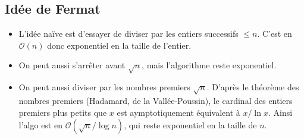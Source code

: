         \subsection{Idée de Fermat}
            \begin{itemize}
                \item L'idée naïve est d'essayer de diviser par les entiers successifs $\leq n$. C'est en $\mathcal{O}(n)$ donc exponentiel en la taille de l'entier.
                \item On peut aussi s'arrêter avant $\sqrt{n}$, mais l'algorithme reste exponentiel.
                \item On peut aussi diviser par les nombres premiers $\sqrt{n}$. D'après le théorème des nombres premiers (Hadamard, de la Vallée-Poussin), le cardinal des entiers premiers plus petits que $x$ est aymptotiquement équivalent à $x/\ln x$. Ainsi l'algo est en $\mathcal{O}(\sqrt{n}/\log n)$, qui reste exponentiel en la taille de $n$.
            \end{itemize}
            
            
